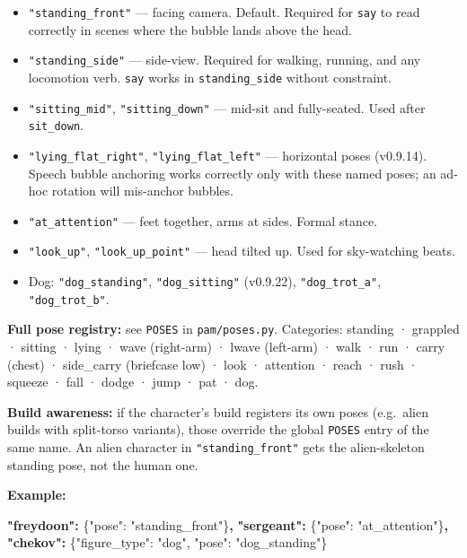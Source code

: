 \documentclass[
  12pt,
  letterpaper,
]{book}
\newenvironment{Shaded}{}{}
\newcommand{\DataTypeTok}[1]{\textcolor[rgb]{0.56,0.13,0.00}{#1}}
\newcommand{\ErrorTok}[1]{\textcolor[rgb]{1.00,0.00,0.00}{\textbf{#1}}}
\newcommand{\FunctionTok}[1]{\textcolor[rgb]{0.02,0.16,0.49}{#1}}
\newcommand{\StringTok}[1]{\textcolor[rgb]{0.25,0.44,0.63}{#1}}
\providecommand{\tightlist}{%
  \setlength{\itemsep}{0pt}\setlength{\parskip}{0pt}}
\begin{document}
\begin{itemize}
\tightlist
\item
  \texttt{"standing\_front"} --- facing camera. Default. Required for
  \texttt{say} to read correctly in scenes where the bubble lands above
  the head.
\item
  \texttt{"standing\_side"} --- side-view. Required for walking,
  running, and any locomotion verb. \texttt{say} works in
  \texttt{standing\_side} without constraint.
\item
  \texttt{"sitting\_mid"}, \texttt{"sitting\_down"} --- mid-sit and
  fully-seated. Used after \texttt{sit\_down}.
\item
  \texttt{"lying\_flat\_right"}, \texttt{"lying\_flat\_left"} ---
  horizontal poses (v0.9.14). Speech bubble anchoring works correctly
  only with these named poses; an ad-hoc rotation will mis-anchor
  bubbles.
\item
  \texttt{"at\_attention"} --- feet together, arms at sides. Formal
  stance.
\item
  \texttt{"look\_up"}, \texttt{"look\_up\_point"} --- head tilted up.
  Used for sky-watching beats.
\item
  Dog: \texttt{"dog\_standing"}, \texttt{"dog\_sitting"} (v0.9.22),
  \texttt{"dog\_trot\_a"}, \texttt{"dog\_trot\_b"}.
\end{itemize}

\textbf{Full pose registry:} see \texttt{POSES} in
\texttt{pam/poses.py}. Categories: standing · grappled · sitting · lying
· wave (right-arm) · lwave (left-arm) · walk · run · carry (chest) ·
side\_carry (briefcase low) · look · attention · reach · rush · squeeze
· fall · dodge · jump · pat · dog.

\textbf{Build awareness:} if the character's build registers its own
poses (e.g.~alien builds with split-torso variants), those override the
global \texttt{POSES} entry of the same name. An alien character in
\texttt{"standing\_front"} gets the alien-skeleton standing pose, not
the human one.

\textbf{Example:}

\begin{Shaded}
\begin{Highlighting}[]
\ErrorTok{"freydoon":} \FunctionTok{\{}\DataTypeTok{"pose"}\FunctionTok{:} \StringTok{"standing\_front"}\FunctionTok{\}}\ErrorTok{,}
\ErrorTok{"sergeant":} \FunctionTok{\{}\DataTypeTok{"pose"}\FunctionTok{:} \StringTok{"at\_attention"}\FunctionTok{\}}\ErrorTok{,}
\ErrorTok{"chekov":}   \FunctionTok{\{}\DataTypeTok{"figure\_type"}\FunctionTok{:} \StringTok{"dog"}\FunctionTok{,} \DataTypeTok{"pose"}\FunctionTok{:} \StringTok{"dog\_standing"}\FunctionTok{\}}
\end{Highlighting}
\end{Shaded}
\end{document}

